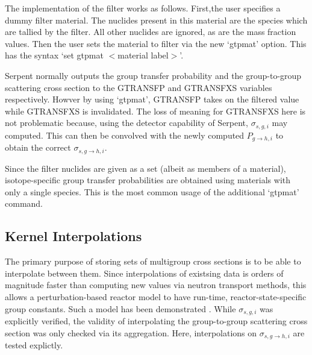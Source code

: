 \documentclass{physor2012}
\begin{document}
The implementation of the filter works as follows. First,the user specifies
a dummy filter material.  The nuclides present in this material are the species 
which are tallied by the filter.  All other nuclides are ignored, as are the mass 
fraction values.  Then the user sets the material to filter via the new `gtpmat'
option.  This has the syntax `set gtpmat $<$material label$>$'.

Serpent normally outputs the group transfer probability and the group-to-group
scattering cross section to the GTRANSFP and GTRANSFXS variables respectively.
Howver by using `gtpmat', GTRANSFP takes on the filtered value while GTRANSFXS
is invalidated.  The loss of meaning for GTRANSFXS here is not problematic
because, using the detector capability of Serpent, $\sigma_{s,g,i}$ may computed.
This can then be convolved with the newly computed $P_{g\to h,i}$ to obtain
the correct $\sigma_{s,g\to h,i}$.

Since the filter nuclides are given as a set (albeit as members of a material), 
isotope-specific group transfer probabilities are obtained using materials with 
only a single species.  This is the most common usage of the additional `gtpmat'
command.

\subsection{Kernel Interpolations}

The primary purpose of storing sets of multigroup cross sections is 
to be able to interpolate between them.  Since interpolations of existsing 
data is orders of magnitude faster than computing new values via neutron 
transport methods, this allows a perturbation-based reactor model to have
run-time, reactor-state-specific group constants.  Such a model has been
demonstrated \cite{}.  While $\sigma_{s,g,i}$ was explicitly 
verified, the validity of interpolating the group-to-group scattering
cross section was only checked via its aggregation.  Here, interpolations on
$\sigma_{s,g\to h,i}$ are tested explictly.
\end{document}
